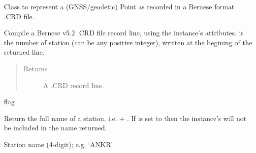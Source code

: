 \documentclass[letterpaper,10pt,english]{sphinxmanual}
\begin{document}
\begin{fulllineitems}
\label{bcrd:bcrd.crdpoint}
Class to represent a (GNSS/geodetic) Point as recorded in a Bernese
format .CRD file.

\begin{fulllineitems}
\label{bcrd:bcrd.crdpoint.asString}
Compile a Bernese v5.2 .CRD file record line, using the instance's
attributes.  is the number of station (can be any positive 
integer), written at the begining of the returned line.
\begin{quote}\begin{description}
\item[{Returns}] \leavevmode
A .CRD record line.

\end{description}\end{quote}

\end{fulllineitems}


\begin{fulllineitems}
\label{bcrd:bcrd.crdpoint.flag_}
flag

\end{fulllineitems}


\begin{fulllineitems}
\label{bcrd:bcrd.crdpoint.name}
Return the full name of a station, i.e. 
 + .
If  is set to  then the instance's
 will not be included in the name returned.

\end{fulllineitems}


\begin{fulllineitems}
\label{bcrd:bcrd.crdpoint.name_}
Station name (4-digit); e.g. `ANKR'


\end{fulllineitems}
\end{fulllineitems}
\end{document}
